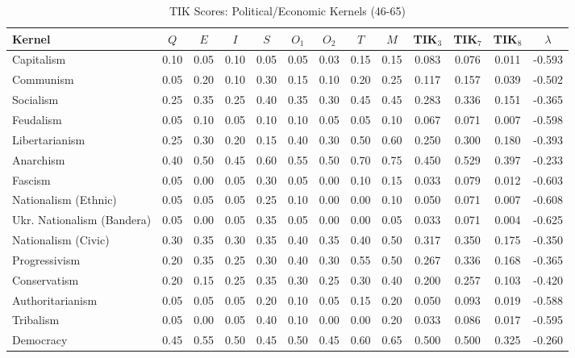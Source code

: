 \documentclass[11pt,a4paper]{article}
\theoremstyle{definition}
\theoremstyle{remark}
\begin{document}
\begin{table}[H]
\centering
\caption{TIK Scores: Political/Economic Kernels (46-65)}
\label{tab:tik-political}
\scriptsize
\begin{tabular}{@{}l|ccccccc|c|cccc@{}}
\toprule
\textbf{Kernel} & $Q$ & $E$ & $I$ & $S$ & $O_1$ & $O_2$ & $T$ & $M$ & \textbf{TIK$_3$} & \textbf{TIK$_7$} & \textbf{TIK$_8$} & $\lambda$ \\
\midrule
Capitalism & 0.10 & 0.05 & 0.10 & 0.05 & 0.05 & 0.03 & 0.15 & 0.15 & 0.083 & 0.076 & 0.011 & -0.593 \\
Communism & 0.05 & 0.20 & 0.10 & 0.30 & 0.15 & 0.10 & 0.20 & 0.25 & 0.117 & 0.157 & 0.039 & -0.502 \\
Socialism & 0.25 & 0.35 & 0.25 & 0.40 & 0.35 & 0.30 & 0.45 & 0.45 & 0.283 & 0.336 & 0.151 & -0.365 \\
Feudalism & 0.05 & 0.10 & 0.05 & 0.10 & 0.10 & 0.05 & 0.05 & 0.10 & 0.067 & 0.071 & 0.007 & -0.598 \\
Libertarianism & 0.25 & 0.30 & 0.20 & 0.15 & 0.40 & 0.30 & 0.50 & 0.60 & 0.250 & 0.300 & 0.180 & -0.393 \\
Anarchism & 0.40 & 0.50 & 0.45 & 0.60 & 0.55 & 0.50 & 0.70 & 0.75 & 0.450 & 0.529 & 0.397 & -0.233 \\
Fascism & 0.05 & 0.00 & 0.05 & 0.30 & 0.05 & 0.00 & 0.10 & 0.15 & 0.033 & 0.079 & 0.012 & -0.603 \\
Nationalism (Ethnic) & 0.05 & 0.05 & 0.05 & 0.25 & 0.10 & 0.00 & 0.00 & 0.10 & 0.050 & 0.071 & 0.007 & -0.608 \\
Ukr. Nationalism (Bandera) & 0.05 & 0.00 & 0.05 & 0.35 & 0.05 & 0.00 & 0.00 & 0.05 & 0.033 & 0.071 & 0.004 & -0.625 \\
Nationalism (Civic) & 0.30 & 0.35 & 0.30 & 0.35 & 0.40 & 0.35 & 0.40 & 0.50 & 0.317 & 0.350 & 0.175 & -0.350 \\
Progressivism & 0.20 & 0.35 & 0.25 & 0.30 & 0.40 & 0.30 & 0.55 & 0.50 & 0.267 & 0.336 & 0.168 & -0.365 \\
Conservatism & 0.20 & 0.15 & 0.25 & 0.35 & 0.30 & 0.25 & 0.30 & 0.40 & 0.200 & 0.257 & 0.103 & -0.420 \\
Authoritarianism & 0.05 & 0.05 & 0.05 & 0.20 & 0.10 & 0.05 & 0.15 & 0.20 & 0.050 & 0.093 & 0.019 & -0.588 \\
Tribalism & 0.05 & 0.00 & 0.05 & 0.40 & 0.10 & 0.00 & 0.00 & 0.20 & 0.033 & 0.086 & 0.017 & -0.595 \\
Democracy & 0.45 & 0.55 & 0.50 & 0.45 & 0.50 & 0.45 & 0.60 & 0.65 & 0.500 & 0.500 & 0.325 & -0.260 \\

\end{tabular}
\end{table}
\end{document}
